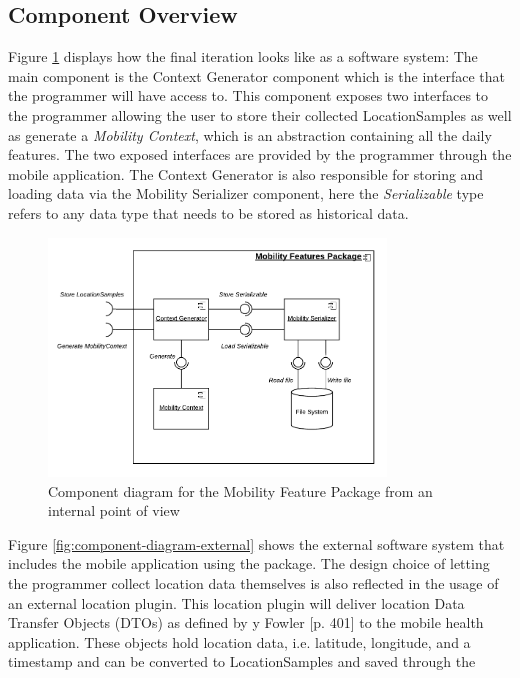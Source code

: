 \subsection{Component Overview}
Figure \ref{fig:component-diagram-internal} displays how the final iteration looks like as a software system: The main component is the Context Generator component which is the interface that the programmer will have access to. This component exposes two interfaces to the programmer allowing the user to store their collected LocationSamples as well as generate a \textit{Mobility Context}, which is an abstraction containing all the daily features. The two exposed interfaces are provided by the programmer through the mobile application. The Context Generator is also responsible for storing and loading data via the Mobility Serializer component, here the \textit{Serializable} type refers to any data type that needs to be stored as historical data.

\begin{figure}[h]
\centering
\includegraphics[width=0.8\textwidth]{images/diagrams/component-internal.pdf}
\caption{Component diagram for the Mobility Feature Package from an internal point of view}
\label{fig:component-diagram-internal}
\end{figure}

Figure \ref{fig:component-diagram-external} shows the external software system that includes the mobile application using the package. The design choice of letting the programmer collect location data themselves is also reflected in the usage of an external location plugin. This location plugin will deliver location Data Transfer Objects (DTOs) as defined by y Fowler \cite{fowler-PEEA} [p. 401] to the mobile health application. These objects hold location data, i.e. latitude, longitude, and a timestamp and can be converted to LocationSamples and saved through the \textit{}


